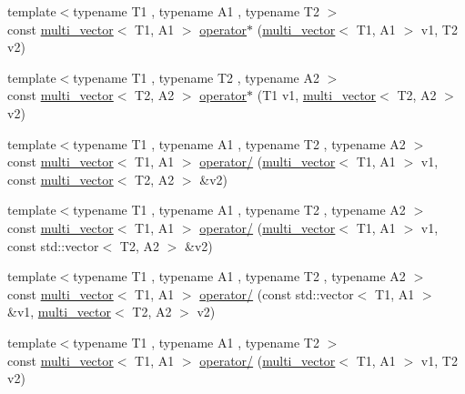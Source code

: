 \begin{DoxyCompactItemize}
\item 
{\footnotesize template$<$typename T1 , typename A1 , typename T2 $>$ }\\const \hyperlink{classIceBRG_1_1multi__vector}{multi\-\_\-vector}$<$ T1, A1 $>$ \hyperlink{namespaceIceBRG_a52ad9ecdfacfd81a0b3071f17322bbe4}{operator$\ast$} (\hyperlink{classIceBRG_1_1multi__vector}{multi\-\_\-vector}$<$ T1, A1 $>$ v1, T2 v2)
\item 
{\footnotesize template$<$typename T1 , typename T2 , typename A2 $>$ }\\const \hyperlink{classIceBRG_1_1multi__vector}{multi\-\_\-vector}$<$ T2, A2 $>$ \hyperlink{namespaceIceBRG_a2bed0c80e72d70765507f839f5d7024d}{operator$\ast$} (T1 v1, \hyperlink{classIceBRG_1_1multi__vector}{multi\-\_\-vector}$<$ T2, A2 $>$ v2)
\item 
{\footnotesize template$<$typename T1 , typename A1 , typename T2 , typename A2 $>$ }\\const \hyperlink{classIceBRG_1_1multi__vector}{multi\-\_\-vector}$<$ T1, A1 $>$ \hyperlink{namespaceIceBRG_a74e3345007374a26851ec9409f9a1b49}{operator/} (\hyperlink{classIceBRG_1_1multi__vector}{multi\-\_\-vector}$<$ T1, A1 $>$ v1, const \hyperlink{classIceBRG_1_1multi__vector}{multi\-\_\-vector}$<$ T2, A2 $>$ \&v2)
\item 
{\footnotesize template$<$typename T1 , typename A1 , typename T2 , typename A2 $>$ }\\const \hyperlink{classIceBRG_1_1multi__vector}{multi\-\_\-vector}$<$ T1, A1 $>$ \hyperlink{namespaceIceBRG_a9efa03563d9a194728d53b924956194c}{operator/} (\hyperlink{classIceBRG_1_1multi__vector}{multi\-\_\-vector}$<$ T1, A1 $>$ v1, const std\-::vector$<$ T2, A2 $>$ \&v2)
\item 
{\footnotesize template$<$typename T1 , typename A1 , typename T2 , typename A2 $>$ }\\const \hyperlink{classIceBRG_1_1multi__vector}{multi\-\_\-vector}$<$ T1, A1 $>$ \hyperlink{namespaceIceBRG_a08b92990f0e893494599c7450a206690}{operator/} (const std\-::vector$<$ T1, A1 $>$ \&v1, \hyperlink{classIceBRG_1_1multi__vector}{multi\-\_\-vector}$<$ T2, A2 $>$ v2)
\item 
{\footnotesize template$<$typename T1 , typename A1 , typename T2 $>$ }\\const \hyperlink{classIceBRG_1_1multi__vector}{multi\-\_\-vector}$<$ T1, A1 $>$ \hyperlink{namespaceIceBRG_af4f974023316002e353c6218f893f2e9}{operator/} (\hyperlink{classIceBRG_1_1multi__vector}{multi\-\_\-vector}$<$ T1, A1 $>$ v1, T2 v2)
\item 

\end{DoxyCompactItemize}
